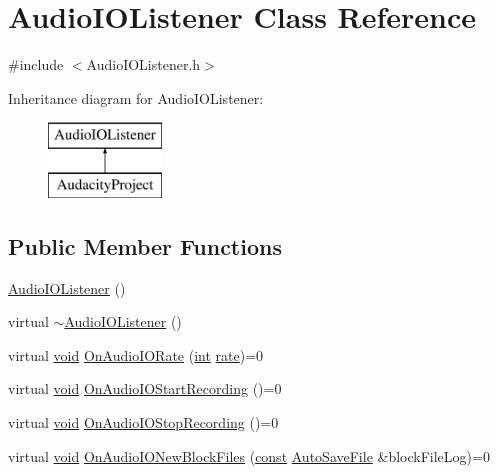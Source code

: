\hypertarget{class_audio_i_o_listener}{}\section{Audio\+I\+O\+Listener Class Reference}
\label{class_audio_i_o_listener}


{\ttfamily \#include $<$Audio\+I\+O\+Listener.\+h$>$}

Inheritance diagram for Audio\+I\+O\+Listener\+:\begin{figure}[H]
\begin{center}
\leavevmode
\includegraphics[height=2.000000cm]{class_audio_i_o_listener}
\end{center}
\end{figure}
\subsection*{Public Member Functions}
\begin{DoxyCompactItemize}
\item 
\hyperlink{class_audio_i_o_listener_abd124e6ac835f2ddb8dbc036e469185b}{Audio\+I\+O\+Listener} ()
\item 
virtual \hyperlink{class_audio_i_o_listener_ad33d9783bd3ad9236615199759e244fb}{$\sim$\+Audio\+I\+O\+Listener} ()
\item 
virtual \hyperlink{sound_8c_ae35f5844602719cf66324f4de2a658b3}{void} \hyperlink{class_audio_i_o_listener_a00ddcdc04b3cffad7c13af911cbdf8a3}{On\+Audio\+I\+O\+Rate} (\hyperlink{xmltok_8h_a5a0d4a5641ce434f1d23533f2b2e6653}{int} \hyperlink{seqread_8c_ad89d3fac2deab7a9cf6cfc8d15341b85}{rate})=0
\item 
virtual \hyperlink{sound_8c_ae35f5844602719cf66324f4de2a658b3}{void} \hyperlink{class_audio_i_o_listener_a6605f1f623616553494833c3ef26d2fe}{On\+Audio\+I\+O\+Start\+Recording} ()=0
\item 
virtual \hyperlink{sound_8c_ae35f5844602719cf66324f4de2a658b3}{void} \hyperlink{class_audio_i_o_listener_a0d30cdf11224284feba2201d1196edb6}{On\+Audio\+I\+O\+Stop\+Recording} ()=0
\item 
virtual \hyperlink{sound_8c_ae35f5844602719cf66324f4de2a658b3}{void} \hyperlink{class_audio_i_o_listener_a08c62f656de8a745e2bfbdf5975fb709}{On\+Audio\+I\+O\+New\+Block\+Files} (\hyperlink{getopt1_8c_a2c212835823e3c54a8ab6d95c652660e}{const} \hyperlink{class_auto_save_file}{Auto\+Save\+File} \&block\+File\+Log)=0
\end{DoxyCompactItemize}


